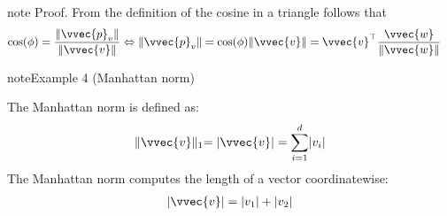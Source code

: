 \documentclass[letterpaper,10pt,english]{jupyterBook}
\begin{document}
\begin{sphinxadmonition}{note}
\sphinxAtStartPar
Proof. From the definition of the cosine in a triangle follows that
\begin{align*}
\cos(\phi)= \frac{\lVert\vvec{p}_v\rVert}{\lVert \vvec{v}\rVert} 
&\Leftrightarrow \lVert \vvec{p}_v\rVert =\cos(\phi)\lVert \vvec{v}\rVert =\vvec{v}^\top \frac{\vvec{w}}{\lVert \vvec{w}\rVert} 
\end{align*}\end{sphinxadmonition}
\label{linalg_normed_vs:example-3}
\begin{sphinxadmonition}{note}{Example 4 (Manhattan norm)}



\sphinxAtStartPar
The Manhattan norm is defined as:
\begin{equation*}
\begin{split}\lVert \vvec{v}\lVert_1 = \lvert \vvec{v}\rvert =\sum_{i=1}^d \lvert v_i\rvert\end{split}
\end{equation*}
The Manhattan norm computes the length of a vector coordinate\sphinxhyphen{}wise:
\begin{equation*}
\begin{split}\lvert \vvec{v}\rvert = \lvert v_1\rvert + \lvert v_2\rvert\end{split}
\end{equation*}
\begin{center}\end{center}\end{sphinxadmonition}
\label{linalg_normed_vs:example-4}
\end{document}
